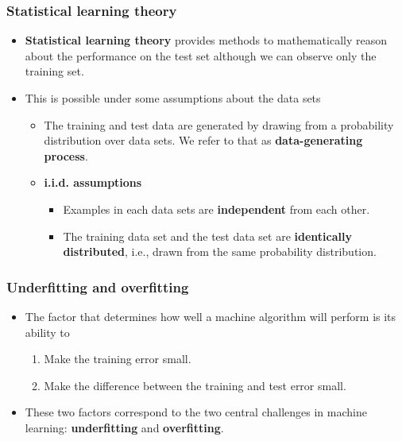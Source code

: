 \documentclass[notes]{beamer}          %
\newif\iffull
\begin{document}
\begin{frame}
\frametitle{Statistical learning theory}
    \begin{itemize}
        \item {\bf Statistical learning theory} provides methods to mathematically reason about the performance on the test set although we can observe only the training set.
        \item This is possible under some assumptions about the data sets
            \begin{itemize}
                \item The training and test data are generated by drawing from a probability distribution over data sets. We refer to that as {\bf data-generating process}.
                \item {\bf i.i.d. assumptions}
                    \begin{itemize}
                        \item Examples in each data sets are {\bf independent} from each other.
                        \item The training data set and the test data set are {\bf identically distributed}, i.e., drawn from the same probability distribution.
                    \end{itemize}
            \end{itemize}

    \end{itemize}
\end{frame}


\begin{frame}
\frametitle{Underfitting and overfitting}
    \begin{itemize}
        \item The factor that determines how well a machine algorithm will perform is its ability to
            \begin{enumerate}
                \item Make the training error small.
                \item Make the difference between the training and test error small.
            \end{enumerate}
        \item These two factors correspond to the two central challenges in machine learning: {\bf underfitting} and {\bf overfitting}.
        
	\iffull
        \item Underfitting occurs when the model is not able to produce a sufficiently small training error.
        \item Overfitting occurs when the gap between the training and test errors is too large.
	\fi
	
    \end{itemize}
\end{frame}
\end{document}
